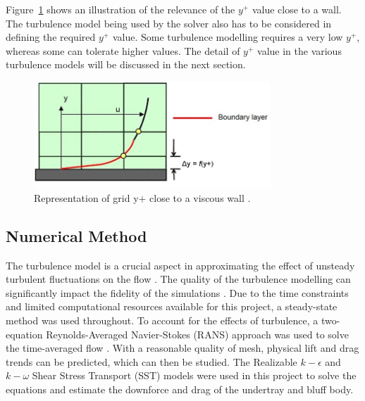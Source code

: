 \noindent Figure~\ref{fig:inflation layer} shows an illustration of the relevance of the $y^+$ value close to a wall. The turbulence model being used by the solver also has to be considered in defining the required $y^+$ value. Some turbulence modelling requires a very low $y^+$, whereas some can tolerate higher values. The detail of $y^+$ value in the various turbulence models will be discussed in the next section. 

\begin{figure}[!ht]
    \centering
    \includegraphics[height=4cm]{Figures/inflation_layer.jpg}
    \caption{Representation of grid y+ close to a viscous wall \cite{Anonymous2013Inflate4Blog}.}
    \label{fig:inflation layer}
\end{figure}


\subsection{Numerical Method}
\noindent The turbulence model is a crucial aspect in approximating the effect of unsteady turbulent fluctuations on the flow \cite{Cummings2015AppliedAerodynamics}. The quality of the turbulence modelling can significantly impact the fidelity of the simulations \cite{Lanfrit2005BestFLUENT}. Due to the time constraints and limited computational resources available for this project, a steady-state method was used throughout. To account for the effects of turbulence, a two-equation Reynolds-Averaged Navier-Stokes (RANS) approach was used to solve the time-averaged flow \cite{Cummings2015AppliedAerodynamics}. With a reasonable quality of mesh, physical lift and drag trends can be predicted, which can then be studied. The Realizable $k-\epsilon$ and $k-\omega$ Shear Stress Transport (SST) models were used in this project to solve the equations and estimate the downforce and drag of the undertray and bluff body.  

